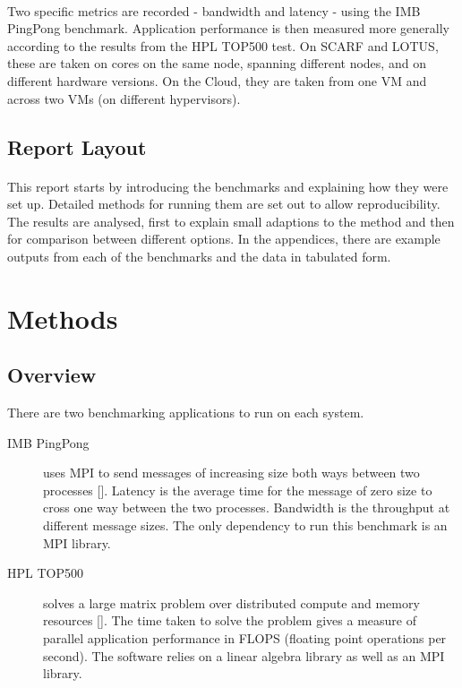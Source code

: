 \documentclass{article}
\begin{document}
        \paragraph{}
        Two specific metrics are recorded - bandwidth and latency - using the IMB PingPong benchmark. Application performance is then measured more generally according to the results from the HPL TOP500 test. On SCARF and LOTUS, these are taken on cores on the same node, spanning different nodes, and on different hardware versions. On the Cloud, they are taken from one VM and across two VMs (on different hypervisors).

    \subsection{Report Layout}
        \paragraph{}
        This report starts by introducing the benchmarks and explaining how they were set up. Detailed methods for running them are set out to allow reproducibility. The results are analysed, first to explain small adaptions to the method and then for comparison between different options. In the appendices, there are example outputs from each of the benchmarks and the data in tabulated form.

\section{Methods}

    \subsection{Overview}
    \label{overview-of-methods}
    There are two benchmarking applications to run on each system.

    \begin{description}
        \item[IMB PingPong] uses MPI to send messages of increasing size both ways between two processes [\cite{intel2016}]. Latency is the average time for the message of zero size to cross one way between the two processes. Bandwidth is the throughput at different message sizes. The only dependency to run this benchmark is an MPI library.
        \item[HPL TOP500] solves a large matrix problem over distributed compute and memory resources [\cite{hpl2016}]. The time taken to solve the problem gives a measure of parallel application performance in FLOPS (floating point operations per second). The software relies on a linear algebra library as well as an MPI library.
    \end{description}
\end{document}
